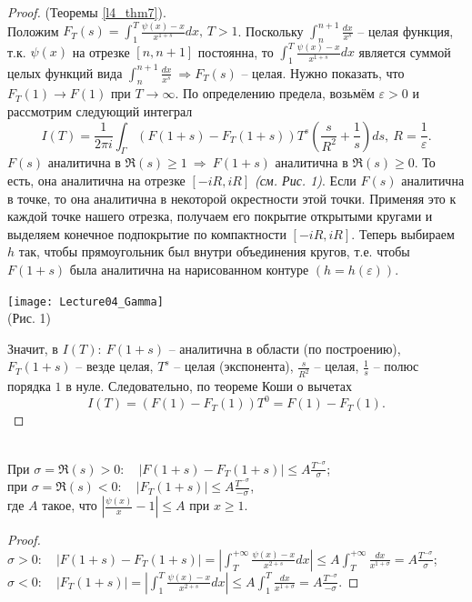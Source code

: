 \begin{proof} (Теоремы \ref{l4_thm7}).\\
	Положим $\displaystyle F_T(s) = \int_1^T \frac{\psi(x)-x}{x^{1+s}}dx, \, T>1$. Поскольку $\displaystyle \int_n^{n+1}\frac{dx}{x^s}$ -- целая функция, т.к. $\psi(x)$ на отрезке $[n, n+1]$ постоянна, то $\displaystyle \int_1^T \frac{\psi(x)-x}{x^{1+s}}dx$ является суммой целых функций вида $\displaystyle \int_n^{n+1}\frac{dx}{x^s} \ \Rightarrow F_T(s)$ -- целая. Нужно показать, что $F_T(1) \to F(1)$ при $T \to \infty$. По определению предела, возьмём $\varepsilon > 0$ и  рассмотрим следующий интеграл
	$$I(T) = \frac{1}{2\pi i}\int_\Gamma \left( F(1+s)-F_T(1+s) \right)T^s\left(\frac{s}{R^2}+\frac{1}{s}\right)ds, \ R = \frac{1}{\varepsilon}.$$
	$F(s)$ аналитична в $\Re(s) \geq 1 \ \Rightarrow \ F(1+s)$ аналитична в $\Re(s) \geq 0$. То есть, она аналитична на отрезке $[-iR, iR]$ \textit{(см. Рис. 1)}. Если $F(s)$ аналитична в точке, то она аналитична в некоторой окрестности этой точки. Применяя это к каждой точке нашего отрезка, получаем его покрытие открытыми кругами и выделяем конечное подпокрытие по компактности $[-iR, iR]$. Теперь выбираем $h$ так, чтобы прямоугольник был внутри объединения кругов, т.е. чтобы $F(1+s)$ была аналитична на нарисованном контуре $(h=h(\varepsilon))$.
	\begin{center}
		\texttt{[image: Lecture04\_Gamma]}~\\
		(Рис. 1)
	\end{center}
	Значит, в $I(T): \ F(1+s)$ -- аналитична в области (по построению), $F_T(1+s)$ -- везде целая, $T^s$ -- целая (экспонента), $\displaystyle \frac{s}{R^2}$ -- целая, $\displaystyle \frac{1}{s}$ -- полюс порядка $1$ в нуле. Следовательно, по теореме Коши о вычетах 
	$$I(T) = \left(F(1)-F_T(1)\right)T^0 = F(1)-F_T(1).$$
\end{proof}

\begin{lemma} \label{l4_lm13}~\\
	При $\displaystyle \sigma = \Re(s)>0: \quad \lvert F(1+s)-F_T(1+s) \rvert \leq A\frac{T^{-\sigma}}{\sigma}$;\\
	при $\displaystyle \sigma = \Re(s)<0: \quad \lvert F_T(1+s) \rvert \leq A\frac{T^{-\sigma}}{-\sigma}$,\\
	где $A$ такое, что $\displaystyle \left| \frac{\psi(x)}{x}-1 \right| \leq A$ при $x \geq 1$.
\end{lemma}
\begin{proof}~\\
	$\displaystyle \sigma>0: \quad \left| F(1+s)-F_T(1+s) \right| = \left| \int_T^{+\infty}\frac{\psi(x)-x}{x^{2+s}}dx \right| \leq A\int_T^{+\infty}\frac{dx}{x^{1+\sigma}} = A\frac{T^{-\sigma}}{\sigma}$;\\
	$\displaystyle \sigma<0: \quad \left| F_T(1+s) \right| = \left| \int_1^T\frac{\psi(x)-x}{x^{2+s}}dx \right| \leq A\int_1^T\frac{dx}{x^{1+\sigma}} = A\frac{T^{-\sigma}}{-\sigma}$.
\end{proof}